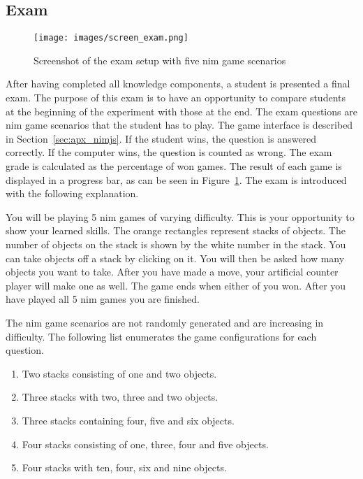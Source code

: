\subsection{Exam}
\label{sec:setup_exam}
\begin{figure}[ht]
    \centering
    \texttt{[image: images/screen\_exam.png]}
    \caption{Screenshot of the exam setup with five nim game scenarios}
    \label{fig:screen_exam}
\end{figure}
After having completed all knowledge components, a student is presented a final
exam. The purpose of this exam is to have an opportunity to compare students at
the beginning of the experiment with those at the end. The exam questions are
nim game scenarios that the student has to play. The game interface is
described in Section~\ref{sec:apx_nimjs}. If the student wins, the
question is answered correctly. If the computer wins, the question is counted
as wrong. The exam grade is calculated as the percentage of won games. The result
of each game is displayed in a progress bar, as can be seen in
Figure~\ref{fig:screen_exam}. The exam is introduced with the following explanation.
\begin{framed}\noindent
	You will be playing 5 nim games of varying difficulty. This is your
	opportunity to show your learned skills. The orange rectangles represent
	stacks of objects. The number of objects on the stack is shown by the white
	number in the stack. You can take objects off a stack by clicking on it.
	You will then be asked how many objects you want to take. After you have
	made a move, your artificial counter player will make one as well. The game
	ends when either of you won.
	After you have played all 5 nim games you are finished.
\end{framed}
\noindent The nim game scenarios are not randomly generated and are increasing in
difficulty. The following list enumerates the game configurations for each
question.
\begin{enumerate}
	\item Two stacks consisting of one and two objects.
	\item Three stacks with two, three and two objects.
	\item Three stacks containing four, five and six objects.
	\item Four stacks consisting of one, three, four and five objects.
	\item Four stacks with ten, four, six and nine objects.
\end{enumerate}
